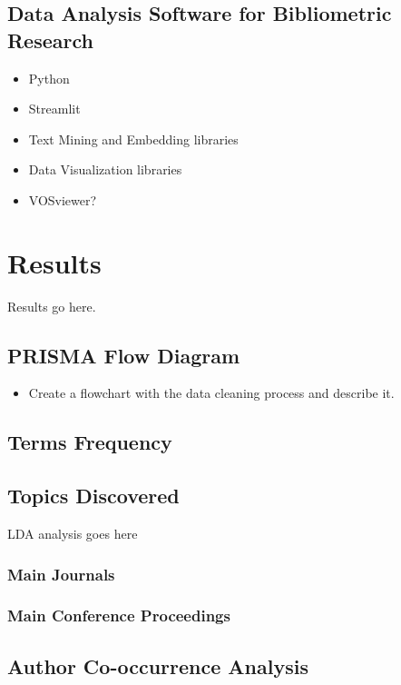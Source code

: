 \documentclass[parskip=full]{scrartcl}
\begin{document}
\subsection{Data Analysis Software for Bibliometric Research}

\begin{itemize}
    \item Python
    \item Streamlit
    \item Text Mining and Embedding libraries
    \item Data Visualization libraries
    \item VOSviewer?
\end{itemize}

\section{Results}

Results go here.

\subsection{PRISMA Flow Diagram}

\begin{itemize}
    \item Create a flowchart with the data cleaning process and describe it.
\end{itemize}

\subsection{Terms Frequency}

\subsection{Topics Discovered}

LDA analysis goes here

\subsubsection{Main Journals}

\subsubsection{Main Conference Proceedings}

\subsection{Author Co-occurrence Analysis}
\end{document}
